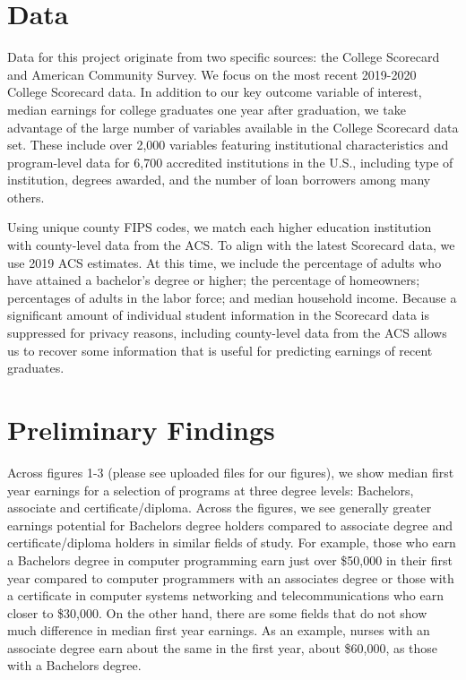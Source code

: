 \documentclass[a4paper, 12pt]{article}
\begin{document}
\section*{Data}

Data for this project originate from two specific sources: the College Scorecard and American Community Survey. We focus on the most recent 2019-2020 College Scorecard data. In addition to our key outcome variable of interest, median earnings for college graduates one year after graduation, we take advantage of the large number of variables available in the College Scorecard data set. These include over 2,000 variables featuring institutional characteristics and program-level data for 6,700 accredited institutions in the U.S., including type of institution, degrees awarded, and the number of loan borrowers among many others.

Using unique county FIPS codes, we match each higher education institution with county-level data from the ACS. To align with the latest Scorecard data, we use 2019 ACS estimates. At this time, we include the percentage of adults who have attained a bachelor's degree or higher; the percentage of homeowners; percentages of adults in the labor force; and median household income. Because a significant amount of individual student information in the Scorecard data is suppressed for privacy reasons, including county-level data from the ACS allows us to recover some information that is useful for predicting earnings of recent graduates.

\section*{Preliminary Findings}

Across figures 1-3 (please see uploaded files for our figures), we show median first year earnings for a selection of programs at three degree levels: Bachelors, associate and certificate/diploma. Across the figures, we see generally greater earnings potential for Bachelors degree holders compared to associate degree and certificate/diploma holders in similar fields of study. For example, those who earn a Bachelors degree in computer programming earn just over \$50,000 in their first year compared to computer programmers with an associates degree or those with a certificate in computer systems networking and telecommunications who earn closer to \$30,000. On the other hand, there are some fields that do not show much difference in median first year earnings. As an example, nurses with an associate degree earn about the same in the first year, about \$60,000, as those with a Bachelors degree.
\end{document}
